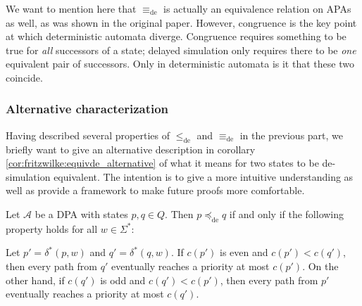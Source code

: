 We want to mention here that $\equiv_\text{de}$ is actually an equivalence relation on APAs as well, as was shown in the original paper. However, congruence is the key point at which deterministic automata diverge. Congruence requires something to be true for \emph{all} successors of a state; delayed simulation only requires there to be \emph{one} equivalent pair of successors. Only in deterministic automata is it that these two coincide.



\vspace{1cm}
\subsubsection*{Alternative characterization}
Having described several properties of $\leq_\text{de}$ and $\equiv_\text{de}$ in the previous part, we briefly want to give an alternative description in corollary \ref{cor:fritzwilke:equivde_alternative} of what it means for two states to be de-simulation equivalent. The intention is to give a more intuitive understanding as well as provide a framework to make future proofs more comfortable.

\begin{lem}
\label{lem:fritzwilke:preceq_alternative}
	Let $\mathcal{A}$ be a DPA with states $p, q \in Q$. Then $p \preceq_\text{de} q$ if and only if the following property holds for all $w \in \Sigma^*$: 
	
	Let $p' = \delta^*(p, w)$ and $q' = \delta^*(q, w)$. If $c(p')$ is even and $c(p') < c(q')$, then every path from $q'$ eventually reaches a priority at most $c(p')$. On the other hand, if $c(q')$ is odd and $c(q') < c(p')$, then every path from $p'$ eventually reaches a priority at most $c(q')$.
\end{lem}

